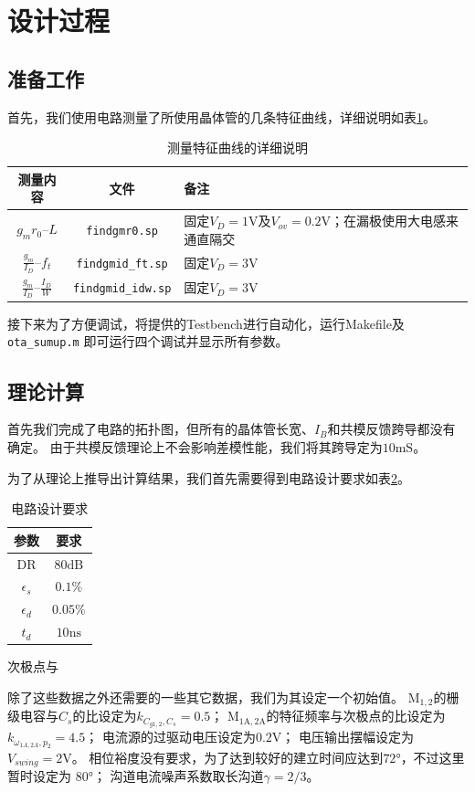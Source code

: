 \documentclass[a4paper]{article}
\newcommand{\uV}{\si{\volt}}
\newcommand{\uns}{\si{\nano\second}}
\newcommand{\umS}{\si{\milli\siemens}}
\newcommand{\udB}{\si{\deci\bel}}
\newcommand{\udeg}{\si{\degree}}
\newcommand{\dM}[1]{\mathrm{M}_\mathrm{#1}}
\newcommand{\DM}[1]{$\dM{#1}$}
\begin{document}
\section{设计过程}
\subsection{准备工作}
首先，我们使用电路测量了所使用晶体管的几条特征曲线，详细说明如表\ref{finds}。
\begin{table}
  \begin{center}
    \begin{tabular}{ccp{5cm}}
      测量内容 & 文件 & 备注 \\\hline
      $g_mr_0$--$L$ & \texttt{findgmr0.sp} & 
            固定$V_D=1\uV$及$V_{ov}=0.2\uV$；在漏极使用大电感来通直隔交 \\
      $\frac{g_m}{I_D}$--$f_t$ & \texttt{findgmid\_ft.sp} &
            固定$V_D=3\uV$    \\
      $\frac{g_m}{I_D}$--$\frac{I_D}{W}$ & \texttt{findgmid\_idw.sp} &
            固定$V_D=3\uV$    
    \end{tabular}
  \end{center}
  \caption{测量特征曲线的详细说明}
  \label{finds}
\end{table}

接下来为了方便调试，将提供的Testbench进行自动化，运行Makefile及\texttt{ota\_sumup.m}
即可运行四个调试并显示所有参数。

\subsection{理论计算}
首先我们完成了电路的拓扑图，但所有的晶体管长宽、$I_B$和共模反馈跨导都没有确定。
由于共模反馈理论上不会影响差模性能，我们将其跨导定为$10\umS$。

为了从理论上推导出计算结果，我们首先需要得到电路设计要求如表\ref{requirements}。
\begin{table}
  \begin{center}
    \begin{tabular}{cc}
      参数 & 要求 \\\hline
      DR & $80\udB$ \\
      $\epsilon_s$ & $0.1\%$ \\
      $\epsilon_d$ & $0.05\%$ \\
      $t_d$ & $10\uns$ \\
    \end{tabular}
  \end{center}
  \caption{电路设计要求}
  \label{requirements}次极点与
\end{table}
除了这些数据之外还需要的一些其它数据，我们为其设定一个初始值。
\DM{1,2}的栅级电容与$C_s$的比设定为$k_{C_{g1,2},C_s}=0.5$；
\DM{1A,2A}的特征频率与次极点的比设定为$k_{\omega_{1A,2A},p_2}=4.5$；
电流源的过驱动电压设定为$0.2\uV$；
电压输出摆幅设定为$V_{swing}=2\uV$。
相位裕度没有要求，为了达到较好的建立时间应达到$72\udeg$，不过这里暂时设定为
$80\udeg$；
沟道电流噪声系数取长沟道$\gamma=2/3$。
\end{document}

